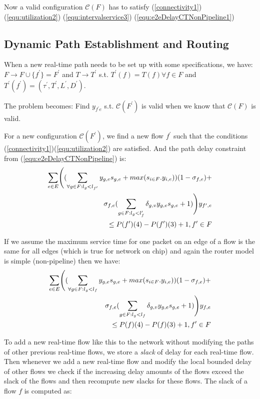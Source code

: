 \documentclass[conference, twocolumn]{IEEEtran}
\theoremstyle{definition}
\begin{document}
Now a valid configuration $\mathcal{C}(F)$ has to satisfy (\ref{connectivity1}) 
(\ref{equ:utilization2})
(\ref{equ:intervalservice3}) (\ref{equ:e2eDelayCTNonPipeline1})

\subsection{Dynamic Path Establishment and Routing}
When a new real-time path needs to be set up with some specifications, we have:
$F \rightarrow F \cup \{f^{'} \}=F^{'}$
and $T \rightarrow T^{'}$ s.t. $T^{'} (f)=T(f)\forall f \in F$ and $T^{'}
(f^{'})=(\tau ^{'}, T^{'}, L^{'}, D^{'})$.

The problem becomes: Find $y_{f^{'}e}$ s.t. $\mathcal{C}(F^{'})$ is valid
when we know that $\mathcal{C}(F)$ is valid.

For a new configuration $\mathcal{C}(F^{'})$, we find a new flow $f^{'}$ such that
the conditions (\ref{connectivity1})(\ref{equ:utilization2}) are satisfied. And
the path delay constraint from (\ref{equ:e2eDelayCTNonPipeline}) is:
\begin{eqnarray}\label{equ:e2eDelayNewPath}
\sum_{e \in E} \Biggl((\sum_{\forall g \in F:l_g <
l_{f'}}y_{g,e}s_{g,e}+max(s_{i \in F}.y_{i,e}))(1-\sigma_{f,e}) +
\notag \\ 
\sigma_{f,e}(\sum_{g \in F:l_g <
l_f'}\delta_{g,v}y_{g,e}s_{g,e} + 1)\Biggr) y_{f',e} \notag \\ \leq
P(f')(4)-P(f')(3) + 1,  f' \in F
\end{eqnarray}

If we assume the maximum service time for one packet on an edge of a flow is the
same for all edges (which is true for network on chip) and again the router
model is simple (non-pipeline) then we have:
\begin{eqnarray}\label{equ:e2eDelayNewPath2}
\sum_{e \in E} \Biggl((\sum_{\forall g \in F:l_g <
l_{f}}y_{g,e}s_{g,e}+max(s_{i \in F}.y_{i,e}))(1-\sigma_{f,e}) +
\notag \\ 
\sigma_{f,e}(\sum_{g \in F:l_g <
l_f}\delta_{g,v}y_{g,e}s_{g,e} + 1)\Biggr) y_{f,e} \notag \\ \leq
P(f)(4)-P(f)(3) + 1,  f' \in F
\end{eqnarray}

To add a new real-time flow like this to the network without modifying the paths
of other previous real-time flows, we store a {\em slack} of delay for each
real-time flow. Then whenever we add a new real-time flow and modify the local
bounded delay of other flows we check if the increasing delay amounts of the
flows exceed the slack of the flows and then recompute new slacks for these
flows. The slack of a flow $f$ is computed as:
\end{document}
